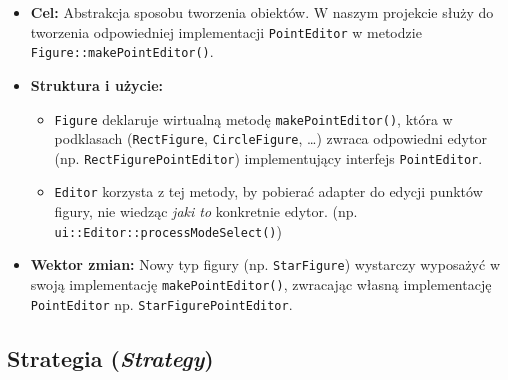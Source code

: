 \documentclass[a4paper,12pt]{article}
\begin{document}
\begin{itemize}
    \item \textbf{Cel:} Abstrakcja sposobu tworzenia obiektów. 
    W naszym projekcie służy do tworzenia odpowiedniej implementacji 
    \texttt{PointEditor} w metodzie \texttt{Figure::makePointEditor()}.
    \item \textbf{Struktura i użycie:}
    \begin{itemize}
        \item \texttt{Figure} deklaruje wirtualną metodę \texttt{makePointEditor()}, 
        która w podklasach (\texttt{RectFigure}, \texttt{CircleFigure}, \dots) zwraca
        odpowiedni edytor (np. \texttt{RectFigurePointEditor}) implementujący interfejs \texttt{PointEditor}.
        \item \texttt{Editor} korzysta z tej metody, by pobierać adapter 
          do edycji punktów figury, nie wiedząc \emph{jaki to} konkretnie edytor. (np. \verb|ui::Editor::processModeSelect()|)
    \end{itemize}
    \item \textbf{Wektor zmian:} Nowy typ figury (np. \texttt{StarFigure}) 
    wystarczy wyposażyć w swoją implementację \texttt{makePointEditor()}, 
    zwracając własną implementację \texttt{PointEditor} np. \texttt{StarFigurePointEditor}.
\end{itemize}

\subsection{Strategia (\emph{Strategy})}
\end{document}
